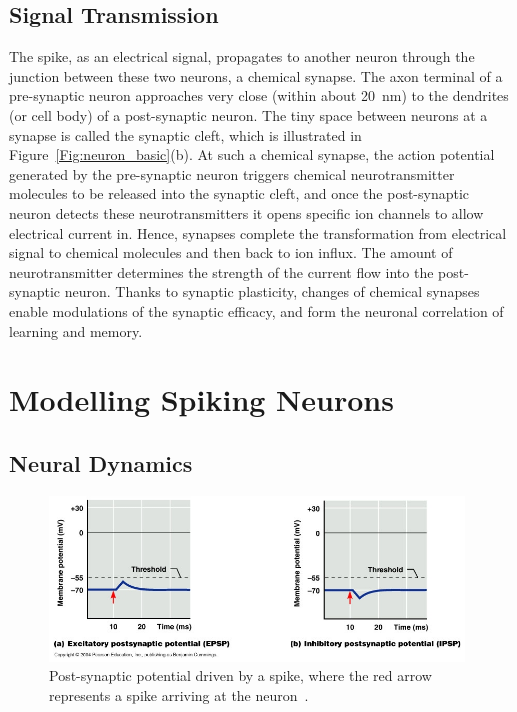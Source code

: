 \subsection{Signal Transmission}
\label{subsec:spike_trans}
The spike, as an electrical signal, propagates to another neuron through the junction between these two neurons, a chemical synapse.
The axon terminal of a pre-synaptic neuron approaches very close (within about 20~nm) to the dendrites (or cell body) of a  post-synaptic neuron.
The tiny space between neurons at a synapse is called the synaptic cleft, which is illustrated in Figure~\ref{Fig:neuron_basic}(b).
At such a chemical synapse, the action potential generated by the pre-synaptic neuron triggers chemical neurotransmitter molecules to be released into the synaptic cleft, and once the post-synaptic neuron detects these neurotransmitters it opens specific ion channels to allow electrical current in.
Hence, synapses complete the transformation from electrical signal to chemical molecules and then back to ion influx.
The amount of neurotransmitter determines the strength of the current flow into the post-synaptic neuron.
Thanks to synaptic plasticity, changes of chemical synapses enable modulations of the synaptic efficacy, and form the neuronal correlation of learning and memory.

\section{Modelling Spiking Neurons}
\label{sec:spike}

\subsection{Neural Dynamics}

\begin{figure}[tb!]
	\centering
	\includegraphics[width=0.98\textwidth]{pics_snn/EI_PSP.JPG}
	\caption[Post-synaptic potential.]{Post-synaptic potential driven by a spike, where the red arrow represents a spike arriving at the neuron~\citep{marieb2007human}.}
	\label{Fig:psp}
\end{figure}


